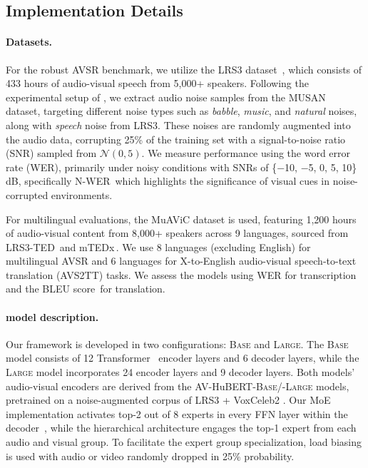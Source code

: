 \subsection{Implementation Details}
\label{sec:implementation}



\paragraph{Datasets.}
For the robust AVSR benchmark, we utilize the LRS3 dataset~\citep{afouras2018lrs3}, which consists of 433 hours of audio-visual speech from 5,000+ speakers. Following the experimental setup of \citet{shi2022robust}, we extract audio noise samples from the MUSAN~\citep{snyder2015musan} dataset, targeting different noise types such as \textit{babble}, \textit{music}, and \textit{natural} noises, along with \textit{speech} noise from LRS3. These noises are randomly augmented into the audio data, corrupting 25\% of the training set with a signal-to-noise ratio (SNR) sampled from $\mathcal{N}(0, 5)$. We measure performance using the word error rate (WER), primarily under noisy conditions with SNRs of \{$-$10, $-$5, 0, 5, 10\}\,dB, specifically N-WER\,\citep{kim2024learning} which highlights the significance of visual cues in noise-corrupted environments.


For multilingual evaluations, the MuAViC dataset \cite{anwar2023muavic} is used, featuring 1,200 hours of audio-visual content from 8,000+ speakers across 9 languages, sourced from LRS3-TED\,\cite{afouras2018lrs3} and mTEDx\,\cite{elizabeth2021multilingual}. We use 8 languages (excluding English) for multilingual AVSR and 6 languages for X-to-English audio-visual speech-to-text translation (AVS2TT) tasks. We assess the models using WER for transcription and the BLEU score\,\cite{papineni2002bleu} for translation.

\vspace*{-8pt}
\paragraph{\ourmodel model description.}

Our \ourmodel framework is developed in two configurations: \textsc{Base} and \textsc{Large}. The \textsc{Base} model consists of 12 Transformer~\citep{vaswani2017attention} encoder layers and 6 decoder layers, while the \textsc{Large} model incorporates 24 encoder layers and 9 decoder layers. Both models’ audio-visual encoders are derived from the AV-HuBERT-\textsc{Base}/-\textsc{Large} models, pretrained on a noise-augmented corpus of LRS3 \citep{afouras2018lrs3} + VoxCeleb2 \citep{chung2018voxceleb2}. Our MoE implementation activates top-2 out of 8 experts in every FFN layer within the decoder~\citep{jiang2024mixtral}, while the hierarchical architecture engages the top-1 expert from each audio and visual group. To facilitate the expert group specialization, load biasing is used with audio or video randomly dropped in 25\% probability.

